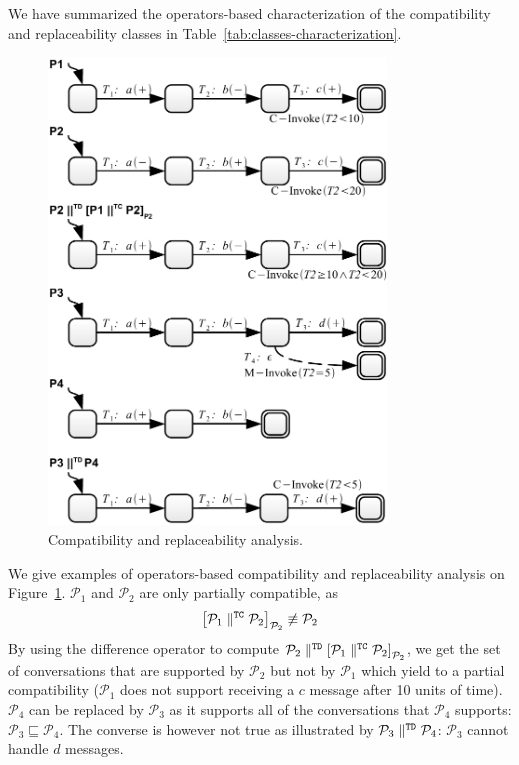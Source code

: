 We have summarized the operators-based characterization of the compatibility and replaceability classes in Table~\ref{tab:classes-characterization}.\\

\begin{figure}[tbhp]
    \centering
    \includegraphics[width=0.8\textwidth]{content/protocol-analysis/compat-and-diff}
    \caption{Compatibility and replaceability analysis.}
    \label{fig:compat-and-diff}
\end{figure}

We give examples of operators-based compatibility and replaceability analysis on Figure~\ref{fig:compat-and-diff}. $\mathcal{P}_1$ and $\mathcal{P}_2$ are only partially compatible, as
$$ \left[ \mathcal{P}_1 \parallel^{\mathtt{TC}} \mathcal{P}_2 \right]_{\mathcal{P}_2} \not\equiv \mathcal{P}_2 $$
By using the difference operator to compute $\mathcal{P}_2 \parallel^{\mathtt{TD}} \left[ \mathcal{P}_1 \parallel^{\mathtt{TC}} \mathcal{P}_2 \right]_{\mathcal{P}_2}$, we get the set of conversations that are supported by $\mathcal{P}_2$ but not by $\mathcal{P}_1$ which yield to a partial compatibility ($\mathcal{P}_1$ does not support receiving a $c$ message after 10 units of time). $\mathcal{P}_4$ can be replaced by $\mathcal{P}_3$ as it supports all of the conversations that $\mathcal{P}_4$ supports: $\mathcal{P}_3 \sqsubseteq \mathcal{P}_4$. The converse is however not true as illustrated by $\mathcal{P}_3 \parallel^{\mathtt{TD}} \mathcal{P}_4$: $\mathcal{P}_3$ cannot handle $d$ messages.

